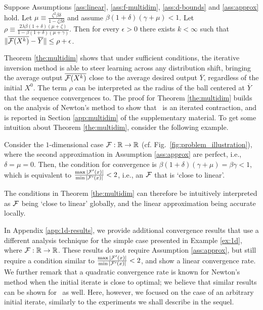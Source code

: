 \documentclass[nohyperref]{article}
\begin{document}
\begin{theorem}\label{the:multidim}
 Suppose Assumptions \ref{ass:linear}, \ref{ass:f-multidim}, \ref{ass:d-bounds} and \ref{ass:approx} hold. Let $\mu\equiv\frac{\zeta^2 \beta \delta}{1-\zeta \beta \delta}$ and assume $\beta(1+\delta)(\gamma + \mu)<1$. Let $\rho \equiv \frac{2\lambda\beta(1+\delta)(\mu + \zeta)}{1-\beta(1+\delta)(\mu+\gamma)}$. Then for every $\epsilon>0$ there exists $k<\infty$ such that $\| \overline{\mathcal{F}(X^k)} - \overline{Y} \| \leq \rho + \epsilon$.
\end{theorem}
Theorem \ref{the:multidim} shows that under sufficient conditions, the iterative inversion method is able to steer learning across any distribution shift, bringing the average output $\overline{\mathcal{F}(X^k)}$ close to the average desired output $\overline{Y}$, regardless of the initial $X^0$. The term $\rho$ can be interpreted as the radius of the ball centered at $\overline{Y}$ that the sequence convergences to.
The proof for Theorem \ref{the:multidim} builds on the analysis of Newton's method to show that \methodname\ is an iterated contraction, and is reported in Section \ref{app:multidim} of the supplementary material. 
To get some intuition about Theorem \ref{the:multidim}, consider the following example.
\begin{example}\label{ex:1d}
Consider the $1$-dimensional case 
$\mathcal{F}:\mathbb{R}\to\mathbb{R}$ (cf. Fig.~\ref{fig:problem_illustration}), where the second approximation in Assumption \ref{ass:approx} are perfect, i.e., $\delta=\mu=0$. Then, the condition for convergence is $\beta(1+\delta)(\gamma+\mu)=\beta \gamma < 1$, which is equivalent to $\frac{\max|\mathcal{F}'(x)|}{\min|\mathcal{F}'(x)|}<2$, i.e., an $\mathcal{F}$ that is `close to linear'. 
\end{example}
The conditions in Theorem \ref{the:multidim} can therefore be intuitively interpreted as $\mathcal{F}$ being `close to linear' globally, and the linear approximation being accurate locally.

In Appendix \ref{app:1d-results}, we provide additional convergence results that use a different analysis technique for the simple case presented in Example \ref{ex:1d}, where $\mathcal{F}:\mathbb{R}\to\mathbb{R}$. These results do not require Assumption \ref{ass:approx}, but still require a condition similar to $\frac{\max|\mathcal{F}'(x)|}{\min|\mathcal{F}'(x)|}<2$, and show a linear convergence rate. We further remark that a quadratic convergence rate is known for Newton's method when the initial iterate is close to optimal; we believe that similar results can be shown for \methodname\ as well. Here, however, we focused on the case of an arbitrary initial iterate, similarly to the experiments we shall describe in the sequel.
\end{document}
